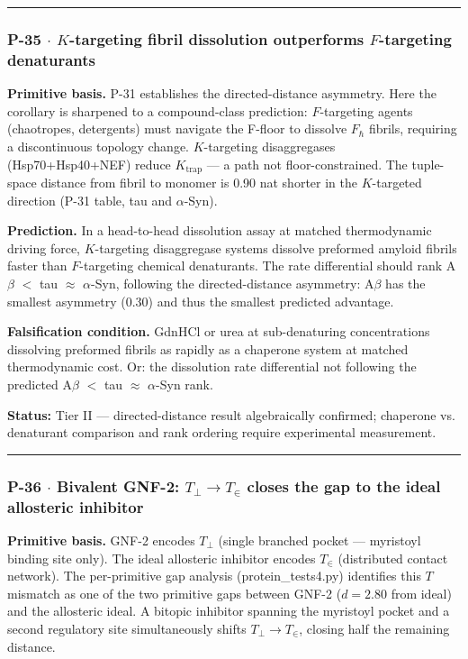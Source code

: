 \documentclass[12pt,a4paper]{article}
\begin{document}
\begin{center}
\rule{0.5\textwidth}{0.4pt}
\end{center}

\subsubsection{P-35 $\cdot$ $K$-targeting fibril dissolution outperforms $F$-targeting denaturants}

\textbf{Primitive basis.} P-31 establishes the directed-distance asymmetry. Here the corollary is sharpened to a compound-class prediction: $F$-targeting agents (chaotropes, detergents) must navigate the F-floor to dissolve $F_\hbar$ fibrils, requiring a discontinuous topology change. $K$-targeting disaggregases (Hsp70+Hsp40+NEF) reduce $K_\text{trap}$ --- a path not floor-constrained. The tuple-space distance from fibril to monomer is 0.90 nat shorter in the $K$-targeted direction (P-31 table, tau and $\alpha$-Syn).

\textbf{Prediction.} In a head-to-head dissolution assay at matched thermodynamic driving force, $K$-targeting disaggregase systems dissolve preformed amyloid fibrils faster than $F$-targeting chemical denaturants. The rate differential should rank A$\beta$ $<$ tau $\approx$ $\alpha$-Syn, following the directed-distance asymmetry: A$\beta$ has the smallest asymmetry (0.30) and thus the smallest predicted advantage.

\textbf{Falsification condition.} GdnHCl or urea at sub-denaturing concentrations dissolving preformed fibrils as rapidly as a chaperone system at matched thermodynamic cost. Or: the dissolution rate differential not following the predicted A$\beta$ $<$ tau $\approx$ $\alpha$-Syn rank.

\textbf{Status:} Tier II --- directed-distance result algebraically confirmed; chaperone vs. denaturant comparison and rank ordering require experimental measurement.

\begin{center}
\rule{0.5\textwidth}{0.4pt}
\end{center}

\subsubsection{P-36 $\cdot$ Bivalent GNF-2: $T_\perp \to T_\in$ closes the gap to the ideal allosteric inhibitor}

\textbf{Primitive basis.} GNF-2 encodes $T_\perp$ (single branched pocket --- myristoyl binding site only). The ideal allosteric inhibitor encodes $T_\in$ (distributed contact network). The per-primitive gap analysis (protein\_tests4.py) identifies this $T$ mismatch as one of the two primitive gaps between GNF-2 ($d = 2.80$ from ideal) and the allosteric ideal. A bitopic inhibitor spanning the myristoyl pocket and a second regulatory site simultaneously shifts $T_\perp \to T_\in$, closing half the remaining distance.
\end{document}
